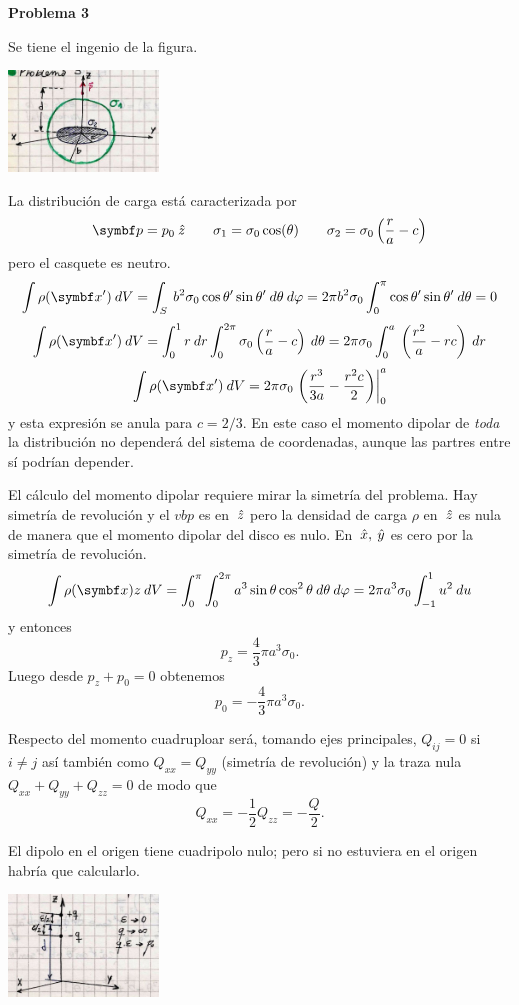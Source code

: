 \documentclass[10pt,oneside]{CBFT_book}
\begin{document}
\begin{ejemplo}{\bf Problema 3}

Se tiene el ingenio de la figura.

\includegraphics[width=0.3\textwidth]{images/fig_ft1_problema_3A.jpg}

La distribución de carga está caracterizada por
\[
	\vb{p} = p_0 \zver \qquad \sigma_1 = \sigma_0 \cos(\theta) 
	\qquad \sigma_2 = \sigma_0\left( \frac{r}{a} - c \right)
\]
pero el casquete es neutro.
\[
	\int \rho(\vbx') \: dV = \int_S \: b^2 \sigma_0 \cos\theta'\sin\theta' \: d\theta \: d\varphi =
	2 \pi b^2 \sigma_0 \int_0^\pi \cos\theta'\sin\theta' \: d\theta = 0
\]
\[
	\int \rho(\vbx') \: dV = \int_0^1 r \: dr  \int_0^{2\pi} \sigma_0 \left( \frac{r}{a} - c \right) \: d\theta =
	2 \pi \sigma_0 \int_0^a \: \left( \frac{r^2}{a} - r c \right) \: dr 
\]
\[
	\int \rho(\vbx') \: dV = 2 \pi \sigma_0 \left. \left( \frac{r^3}{3a} - \frac{r^2 c}{2} \right) \right|_0^a 
\]
y esta expresión se anula para $c = 2 / 3$.
En este caso el momento dipolar de {\it toda} la distribución no dependerá del sistema de coordenadas,
aunque las partres entre sí podrían depender.

El cálculo del momento dipolar requiere mirar la simetría del problema.
Hay simetría de revolución y el $vb{p}$ es en $\:\hat{z}$ pero la densidad de carga $\rho$ en $\:\hat{z}$ es nula
de manera que el momento dipolar del disco es nulo. En $\:\hat{x},\:\hat{y}$ es cero por la simetría de revolución.
\[
	\int \rho(\vbx) z \: dV =  \int_0^\pi \int_0^{2\pi} a^3 \sin \theta \cos^2 \theta \: d\theta \: d\varphi
	= 2 \pi a^3 \sigma_0 \int_{-1}^1 u^2 \: du
\]
y entonces 
\[
	p_z = \frac{4}{3} \pi a^3 \sigma_0.
\]
Luego desde $p_z + p_0 = 0$  obtenemos
\[
	p_0 = -\frac{4}{3} \pi a^3 \sigma_0.
\]

Respecto del momento cuadruploar será, tomando ejes principales, $ Q_{ij} = 0 $ si $i \neq j$ así también
como $Q_{xx} = Q_{yy}$ (simetría de revolución) y la traza nula $Q_{xx} + Q_{yy} + Q_{zz} = 0$ de modo que
\[
	Q_{xx} = -\frac{1}{2} Q_{zz} = -\frac{Q}{2}.
\]

El dipolo en el origen tiene cuadripolo nulo; pero si no estuviera en el origen habría que calcularlo.

\includegraphics[width=0.3\textwidth]{images/fig_ft1_problema_3B.jpg}


\end{ejemplo}
\end{document}
